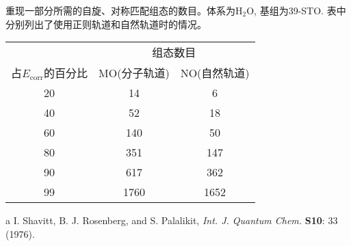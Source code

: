 \begin{threeparttable}[H]
	\caption{重现一部分所需的自旋、对称匹配组态的数目。体系为$\mathrm{H_2O}$, 基组为39-STO. 表中分别列出了使用正则轨道和自然轨道时的情况。}
	\centering
	\begin{tabular}{ccc}
		\hline
		&\multicolumn{2}{c}{组态数目}\\\cline{2-3}
		占$E_\mathrm{corr}$的百分比&MO(分子轨道)&NO(自然轨道)\\\hline
		20&14&6 \\
		40&52&18 \\
		60&140&50\\
		80&351&147\\
		90&617&362\\
		99&1760&1652\\
		\hline
	\end{tabular}
	\begin{tablenotes}
		\item[a] I. Shavitt, B. J. Rosenberg, and S. Palalikit, \textit{Int. J. Quantum Chem.} \textbf{S10}: 33 (1976).
	\end{tablenotes}
\end{threeparttable}
